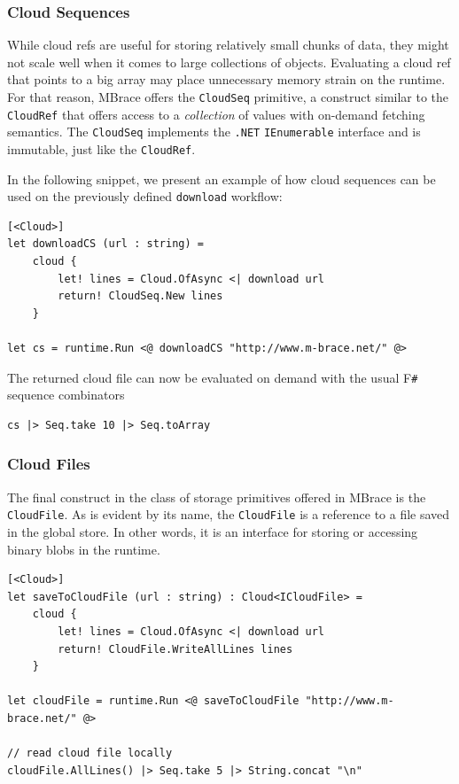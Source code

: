 \documentclass[9pt,a4paper]{article}
\newcommand{\mbrace}{MBrace}
\newcommand{\fsharp}{F\texttt \#}
\newcommand{\dotnet}{\texttt{\hbox{.}NET}}
\begin{document}
\subsubsection*{Cloud Sequences}

While cloud refs are useful for storing relatively small chunks of data,
they might not scale well when it comes to large collections of objects.
Evaluating a cloud ref that points to a big array may place
unnecessary memory strain on the runtime. For that reason,
\mbrace{} offers the \texttt{CloudSeq} primitive, 
a construct similar to the \texttt{CloudRef} that offers access to
a \emph{collection} of values with on-demand fetching semantics.
The \texttt{CloudSeq} implements the \dotnet{} \texttt{IEnumerable} interface 
and is immutable, just like the \texttt{CloudRef}.

In the following snippet, we present an example of how cloud sequences can be
used on the previously defined \texttt{download} workflow:
\begin{lstlisting}
[<Cloud>]
let downloadCS (url : string) =
    cloud {
        let! lines = Cloud.OfAsync <| download url
        return! CloudSeq.New lines
    }
    
let cs = runtime.Run <@ downloadCS "http://www.m-brace.net/" @>
\end{lstlisting}
The returned cloud file can now be evaluated on demand with the usual \fsharp{} 
sequence combinators
\begin{lstlisting}
cs |> Seq.take 10 |> Seq.toArray
\end{lstlisting}

\subsubsection*{Cloud Files}

The final construct in the class of storage primitives offered in \mbrace{}
is the \texttt{CloudFile}. As is evident by its name, the \texttt{CloudFile}
is a reference to a file saved in the global store. In other words, it is an
interface for storing or accessing binary blobs in the runtime.
\begin{lstlisting}
[<Cloud>]
let saveToCloudFile (url : string) : Cloud<ICloudFile> =
    cloud {
        let! lines = Cloud.OfAsync <| download url
        return! CloudFile.WriteAllLines lines
    }
    
let cloudFile = runtime.Run <@ saveToCloudFile "http://www.m-brace.net/" @>

// read cloud file locally
cloudFile.AllLines() |> Seq.take 5 |> String.concat "\n"
\end{lstlisting}
\end{document}
